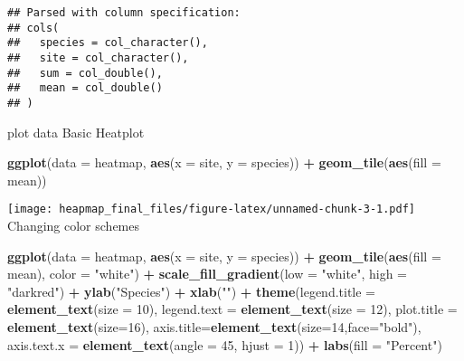 \documentclass[]{article}
\newenvironment{Shaded}{\begin{snugshade}}{\end{snugshade}}
\newcommand{\KeywordTok}[1]{\textcolor[rgb]{0.13,0.29,0.53}{\textbf{#1}}}
\newcommand{\DataTypeTok}[1]{\textcolor[rgb]{0.13,0.29,0.53}{#1}}
\newcommand{\DecValTok}[1]{\textcolor[rgb]{0.00,0.00,0.81}{#1}}
\newcommand{\StringTok}[1]{\textcolor[rgb]{0.31,0.60,0.02}{#1}}
\newcommand{\OperatorTok}[1]{\textcolor[rgb]{0.81,0.36,0.00}{\textbf{#1}}}
\newcommand{\NormalTok}[1]{#1}
\begin{document}
\begin{verbatim}
## Parsed with column specification:
## cols(
##   species = col_character(),
##   site = col_character(),
##   sum = col_double(),
##   mean = col_double()
## )
\end{verbatim}

plot data Basic Heatplot

\begin{Shaded}
\begin{Highlighting}[]
\KeywordTok{ggplot}\NormalTok{(}\DataTypeTok{data =}\NormalTok{ heatmap, }\KeywordTok{aes}\NormalTok{(}\DataTypeTok{x =}\NormalTok{ site, }\DataTypeTok{y =}\NormalTok{ species)) }\OperatorTok{+}\StringTok{ }\KeywordTok{geom_tile}\NormalTok{(}\KeywordTok{aes}\NormalTok{(}\DataTypeTok{fill =}\NormalTok{ mean))}
\end{Highlighting}
\end{Shaded}

\texttt{[image: heapmap\_final\_files/figure-latex/unnamed-chunk-3-1.pdf]}
Changing color schemes

\begin{Shaded}
\begin{Highlighting}[]
\KeywordTok{ggplot}\NormalTok{(}\DataTypeTok{data =}\NormalTok{ heatmap, }\KeywordTok{aes}\NormalTok{(}\DataTypeTok{x =}\NormalTok{ site, }\DataTypeTok{y =}\NormalTok{ species)) }\OperatorTok{+}\StringTok{ }\KeywordTok{geom_tile}\NormalTok{(}\KeywordTok{aes}\NormalTok{(}\DataTypeTok{fill =}\NormalTok{ mean), }\DataTypeTok{color =} \StringTok{"white"}\NormalTok{) }\OperatorTok{+}
\StringTok{  }\KeywordTok{scale_fill_gradient}\NormalTok{(}\DataTypeTok{low =} \StringTok{"white"}\NormalTok{, }\DataTypeTok{high =} \StringTok{"darkred"}\NormalTok{) }\OperatorTok{+}
\StringTok{  }\KeywordTok{ylab}\NormalTok{(}\StringTok{"Species"}\NormalTok{) }\OperatorTok{+}
\StringTok{  }\KeywordTok{xlab}\NormalTok{(}\StringTok{""}\NormalTok{) }\OperatorTok{+}\StringTok{  }
\StringTok{  }\KeywordTok{theme}\NormalTok{(}\DataTypeTok{legend.title =} \KeywordTok{element_text}\NormalTok{(}\DataTypeTok{size =} \DecValTok{10}\NormalTok{),}
        \DataTypeTok{legend.text =} \KeywordTok{element_text}\NormalTok{(}\DataTypeTok{size =} \DecValTok{12}\NormalTok{),}
        \DataTypeTok{plot.title =} \KeywordTok{element_text}\NormalTok{(}\DataTypeTok{size=}\DecValTok{16}\NormalTok{),}
        \DataTypeTok{axis.title=}\KeywordTok{element_text}\NormalTok{(}\DataTypeTok{size=}\DecValTok{14}\NormalTok{,}\DataTypeTok{face=}\StringTok{"bold"}\NormalTok{),}
        \DataTypeTok{axis.text.x =} \KeywordTok{element_text}\NormalTok{(}\DataTypeTok{angle =} \DecValTok{45}\NormalTok{, }\DataTypeTok{hjust =} \DecValTok{1}\NormalTok{)) }\OperatorTok{+}
\StringTok{  }\KeywordTok{labs}\NormalTok{(}\DataTypeTok{fill =} \StringTok{"Percent"}\NormalTok{)}
\end{Highlighting}
\end{Shaded}
\end{document}
